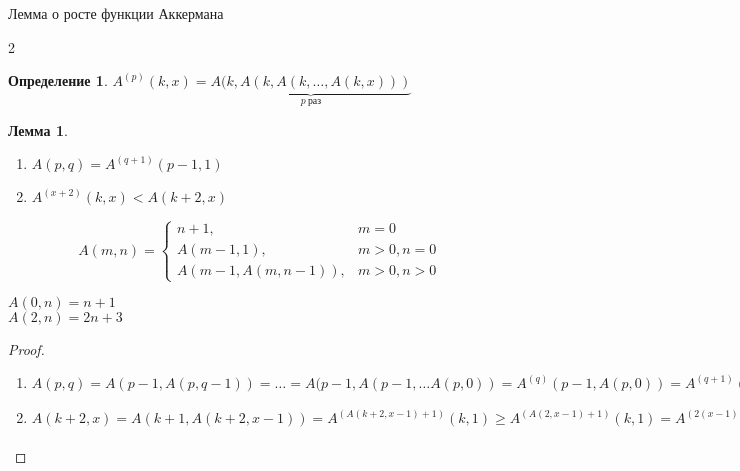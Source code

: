 \documentclass[handout]{beamer}
\newtheorem{dfn}{Определение}[section]
\newtheorem{lmm}{Лемма}[section]
\begin{document}
\begin{frame}{Лемма о росте функции Аккермана}
\begin{multicols}{2}
\begin{dfn}$A^{(p)}(k,x) = \underbrace{A(k,A(k,A(k,\dots,A(k,x)))}_{p\ \text{раз}}$\end{dfn}
\begin{lmm}
\begin{enumerate}
\item $A(p,q) = A^{(q+1)}(p-1,1)$
\item $A^{(x+2)}(k,x) < A(k+2,x)$
\end{enumerate}\end{lmm}
\columnbreak

\color{gray}\footnotesize
$$A(m,n) = \left\{\begin{array}{ll}
  n+1,&m = 0\\
  A(m-1,1),&m > 0, n = 0\\
  A(m-1,A(m,n-1)),&m > 0, n > 0
\end{array}\right.$$

$A(0,n) = n+1$ \\

$A(2,n) = 2n + 3$

\end{multicols}

\vspace{-0.5cm}
\begin{proof}
\begin{enumerate}
\item $A(p,q) = A(p-1,A(p,q-1)) = \dots = A(p-1,A(p-1,\dots A(p,0)) = A^{(q)}(p-1,A(p,0)) = A^{(q+1)}(p-1,1)$

\item

$A(k+2,x) = A(k+1,A(k+2,x-1)) = A^{(A(k+2,x-1)+1)}(k,1) \ge A^{(A(2,x-1)+1)}(k,1) = A^{(2(x-1)+3+1)}(k,1)
= A^{(2x+2)}(k,1) = A^{(x+2)}(k,A^{(x)}(k,1)) \ge A^{(x+2)}(k,A^{(x)}(0,1)) = A^{(x+2)}(k,x+1) > A^{(x+2)}(k,x)$

\end{enumerate}
\end{proof}
\end{frame}
\end{document}
